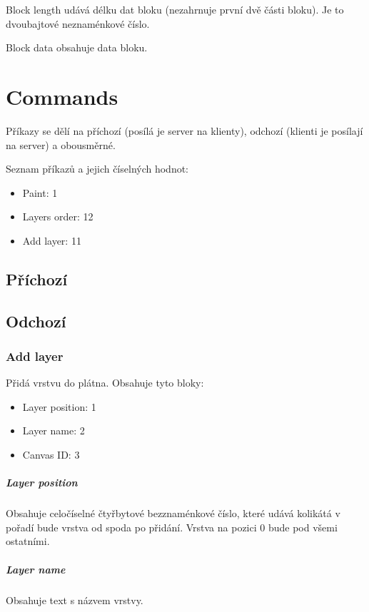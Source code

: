 \documentclass[12pt,oneside,a4paper]{report}
\begin{document}
Block length udává délku dat bloku (nezahrnuje první dvě části bloku). Je to dvoubajtové neznaménkové číslo.

Block data obsahuje data bloku.

\chapter{Commands}

Příkazy se dělí na příchozí (posílá je server na klienty), odchozí (klienti je posílají na server) a obousměrné.

Seznam příkazů a jejich číselných hodnot:

\begin{itemize}
	\item Paint: 1
	\item Layers order: 12
	\item Add layer: 11
\end{itemize}

\section{Příchozí}

\section{Odchozí}

\subsection{Add layer}

Přidá vrstvu do plátna. Obsahuje tyto bloky:

\begin{itemize}
	\item Layer position: 1
	\item Layer name: 2
	\item Canvas ID: 3
\end{itemize}

\paragraph{Layer position}
Obsahuje celočíselné čtyřbytové bezznaménkové číslo, které udává kolikátá v pořadí bude vrstva od spoda po přidání. Vrstva na pozici $0$ bude pod všemi ostatními.

\paragraph{Layer name}
Obsahuje text s názvem vrstvy.
\end{document}
